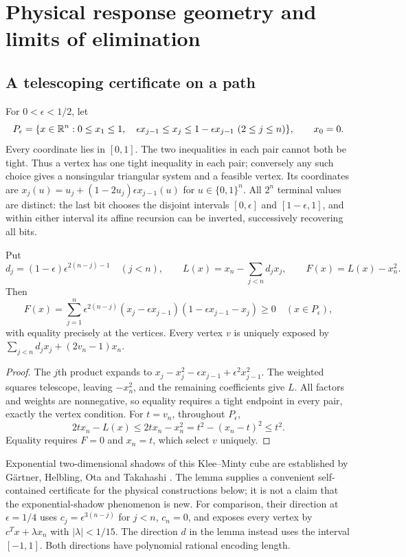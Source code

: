 \section{Physical response geometry and limits of elimination}\label{app:geometry}

\subsection{A telescoping certificate on a path}\label{s6:telescoping}
For $0<\epsilon<1/2$, let
\begin{equation}
 P_\epsilon=\{x\in\mathbb R^n:0\le x_1\le1,\quad
 \epsilon x_{j-1}\le x_j\le1-\epsilon x_{j-1}\ (2\le j\le n)\},
 \qquad x_0=0.\label{s6:km}
\end{equation}
Every coordinate lies in $[0,1]$. The two inequalities in each pair
cannot both be tight. Thus a vertex has one tight inequality in each
pair; conversely any such choice gives a nonsingular triangular system
and a feasible vertex. Its coordinates are
$x_j(u)=u_j+(1-2u_j)\epsilon x_{j-1}(u)$ for $u\in\{0,1\}^n$.
All $2^n$ terminal values are distinct: the last bit chooses the disjoint
intervals $[0,\epsilon]$ and $[1-\epsilon,1]$, and within either interval
its affine recursion can be inverted, successively recovering all bits.

\begin{lemma}\label{s6:certificate}
Put
\[
 d_j=(1-\epsilon)\epsilon^{2(n-j)-1}\quad(j<n),\qquad
 L(x)=x_n-\sum_{j<n}d_jx_j,\qquad F(x)=L(x)-x_n^2.
\]
Then
\begin{equation}
 F(x)=\sum_{j=1}^n\epsilon^{2(n-j)}
 (x_j-\epsilon x_{j-1})(1-\epsilon x_{j-1}-x_j)\ge0
 \quad(x\in P_\epsilon),\label{s6:telescoping-identity}
\end{equation}
with equality precisely at the vertices. Every vertex $v$ is uniquely
exposed by $\sum_{j<n}d_jx_j+(2v_n-1)x_n$.
\end{lemma}
\begin{proof}
The $j$th product expands to
$x_j-x_j^2-\epsilon x_{j-1}+\epsilon^2x_{j-1}^2$.
The weighted squares telescope, leaving $-x_n^2$, and the remaining
coefficients give $L$. All factors and weights are nonnegative, so equality
requires a tight endpoint in every pair, exactly the vertex condition.
For $t=v_n$, throughout $P_\epsilon$,
\[
 2tx_n-L(x)\le 2tx_n-x_n^2=t^2-(x_n-t)^2\le t^2.
\]
Equality requires $F=0$ and $x_n=t$, which select $v$ uniquely.
\end{proof}

Exponential two-dimensional shadows of this Klee--Minty cube are established
by G\"artner, Helbling, Ota and Takahashi
\cite[Section~4]{s6:gartner2013}. The lemma supplies a convenient
self-contained certificate for the physical constructions below; it is
not a claim that the exponential-shadow phenomenon is new.
For comparison, their direction at $\epsilon=1/4$ uses
$c_j=\epsilon^{3(n-j)}$ for $j<n$, $c_n=0$, and exposes every vertex
by $c^Tx+\lambda x_n$ with $|\lambda|<1/15$.
The direction $d$ in the lemma instead uses the interval $[-1,1]$.
Both directions have polynomial rational encoding length.

